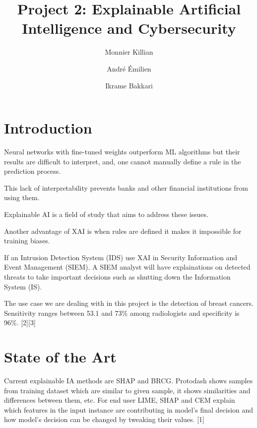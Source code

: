 \documentclass{article}
\author{Monnier Killian\and André Émilien \and Ikrame Bakkari}
\title{Project 2: Explainable Artificial Intelligence and Cybersecurity}
\begin{document}
\maketitle
\section{Introduction}
Neural networks with fine-tuned weights outperform ML algorithms but their results are difficult to interpret, and, one cannot manually define a rule in the prediction process.\par
This lack of interpretability prevents banks and other financial institutions from using them.\par
Explainable AI is a field of study that aims to address these issues.\par
Another advantage of XAI is when rules are defined it makes it impossible for training biases.\par
If an Intrusion Detection System (IDS) use XAI in Security Information and Event Management (SIEM). A SIEM analyst will have explainations on detected threats to take important decisions such as shutting down the Information System (IS).\par
The use case we are dealing with in this project is the detection of breast cancers. Sensitivity ranges between 53.1 and 73\% among radiologists and specificity is 96\%. [2][3]
\section{State of the Art}
Current explainable IA methods are SHAP and BRCG. Protodash shows samples from training dataset which are similar to given sample, it shows similarities and differences between them, etc. For end user LIME, SHAP and CEM explain which features in the input instance are contributing in model's final decision and how model's decision can be changed by tweaking their values. [1]
\end{document}
